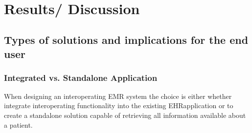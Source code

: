\documentclass[14pt]{article}
\begin{document}

\newpage

\section{Results/ Discussion}
\label{sec:Results}
\subsection{Types of solutions and implications for the end user}
\label{sec:resultsEndUser}
\subsubsection{Integrated vs. Standalone Application}
When designing an interoperating \gls{EMR} system the choice is either whether integrate interoperating functionality into the existing \gls{EHR}application or to create a standalone solution capable of retrieving all information available about a patient.
\end{document}
